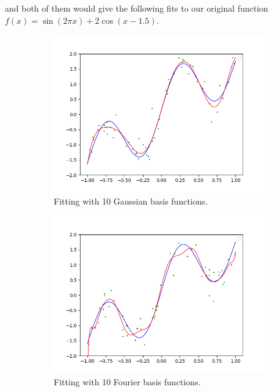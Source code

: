 \documentclass{article}
\theoremstyle{definition}
\begin{document}
    and both of them would give the following fits to our original function $f(x) = \sin(2\pi x) + 2 \cos(x - 1.5)$. 
    \begin{figure}[hbt!]
        \centering
        \begin{subfigure}[b]{0.48\textwidth}
        \centering
            \includegraphics[width=\textwidth]{Section_2/Gaussian_Fit.png}
            \caption{Fitting with 10 Gaussian basis functions. }
            \label{fig:gaussian_basis}
        \end{subfigure}
        \hfill 
        \begin{subfigure}[b]{0.48\textwidth}
        \centering
            \includegraphics[width=\textwidth]{Section_2/Fourier_Fit.png}
            \caption{Fitting with 10 Fourier basis functions. }
            \label{fig:fourier_basis}
        \end{subfigure}
        \caption{}
        \label{Coincide_mean}
    \end{figure}
\end{document}
